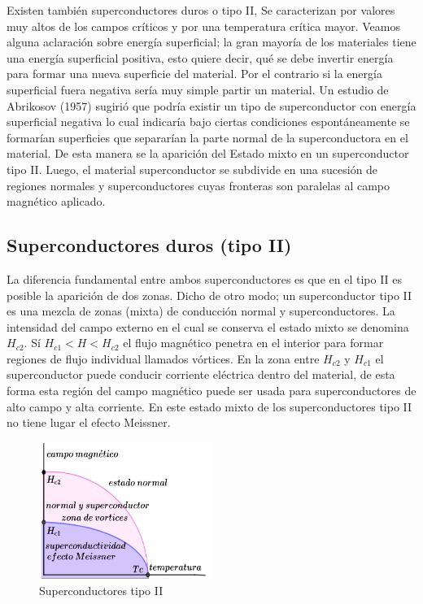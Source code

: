 Existen también superconductores duros o tipo II, Se caracterizan por valores muy altos de los campos críticos y por una temperatura crítica mayor. Veamos alguna aclaración sobre energía superficial; la gran mayoría de los materiales tiene una energía superficial positiva, esto quiere decir, qué se debe invertir energía para formar una nueva superficie del material. Por el contrario si la energía superficial fuera negativa sería muy simple partir un material. Un estudio de Abrikosov (1957) sugirió que podría existir un tipo de superconductor con energía superficial negativa lo cual indicaría bajo ciertas condiciones espontáneamente se formarían superficies que separarían la parte normal de la superconductora en el material. De esta manera se la aparición del Estado mixto en un superconductor tipo II. Luego, el material superconductor se subdivide en una sucesión de regiones normales y superconductores cuyas fronteras son paralelas al campo magnético aplicado.

\subsection{Superconductores duros (tipo II)}

La diferencia fundamental entre ambos superconductores es que en el tipo II es posible la aparición de dos zonas. Dicho de otro modo; un superconductor tipo II es una mezcla de zonas (mixta) de conducción normal y superconductores. La intensidad del campo externo en el cual se conserva el estado mixto se denomina $H_{c2}$. Sí $H_{c1} < H < H_{c2}$ el flujo magnético penetra en el interior para formar regiones de flujo individual llamados vórtices. En la zona entre $H_{c2}$ y $H_{c1}$ el superconductor puede conducir corriente eléctrica dentro del material, de esta forma esta región del campo magnético puede ser usada para superconductores de alto campo y alta corriente. En este estado mixto de los superconductores tipo II no tiene lugar el efecto Meissner.

\begin{figure}[H]
    \centering
    \includegraphics[width=0.5\textwidth]{./Figures/fig420}
	\caption{Superconductores tipo II}
	\label{fig:420}
\end{figure}


